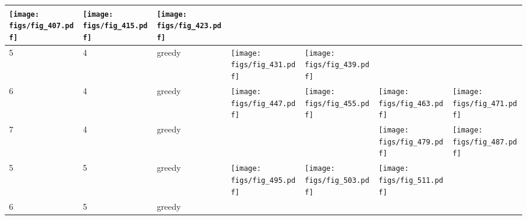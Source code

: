 \documentclass[oneside,canadian,landscape]{article}
\begin{document}
\begin{center}
\begin{longtable}{|l|l|l||l|l|l|l|}
\begin{minipage}{3.5cm}
\texttt{[image: figs/fig\_407.pdf]}
\end{minipage}
&\begin{minipage}{3.5cm}
\texttt{[image: figs/fig\_415.pdf]}
\end{minipage}
&\begin{minipage}{3.5cm}
\texttt{[image: figs/fig\_423.pdf]}
\end{minipage}
\\ \hline
5&4&greedy&\begin{minipage}{3.5cm}
\texttt{[image: figs/fig\_431.pdf]}
\end{minipage}
&\begin{minipage}{3.5cm}
\texttt{[image: figs/fig\_439.pdf]}
\end{minipage}
&&\\ \hline
6&4&greedy&\begin{minipage}{3.5cm}
\texttt{[image: figs/fig\_447.pdf]}
\end{minipage}
&\begin{minipage}{3.5cm}
\texttt{[image: figs/fig\_455.pdf]}
\end{minipage}
&\begin{minipage}{3.5cm}
\texttt{[image: figs/fig\_463.pdf]}
\end{minipage}
&\begin{minipage}{3.5cm}
\texttt{[image: figs/fig\_471.pdf]}
\end{minipage}
\\ \hline
7&4&greedy&&&\begin{minipage}{3.5cm}
\texttt{[image: figs/fig\_479.pdf]}
\end{minipage}
&\begin{minipage}{3.5cm}
\texttt{[image: figs/fig\_487.pdf]}
\end{minipage}
\\ \hline
5&5&greedy&\begin{minipage}{3.5cm}
\texttt{[image: figs/fig\_495.pdf]}
\end{minipage}
&\begin{minipage}{3.5cm}
\texttt{[image: figs/fig\_503.pdf]}
\end{minipage}
&\begin{minipage}{3.5cm}
\texttt{[image: figs/fig\_511.pdf]}
\end{minipage}
&\\ \hline
6&5&greedy&&\begin{minipage}{3.5cm}

\end{minipage}
\end{longtable}
\end{center}
\end{document}
